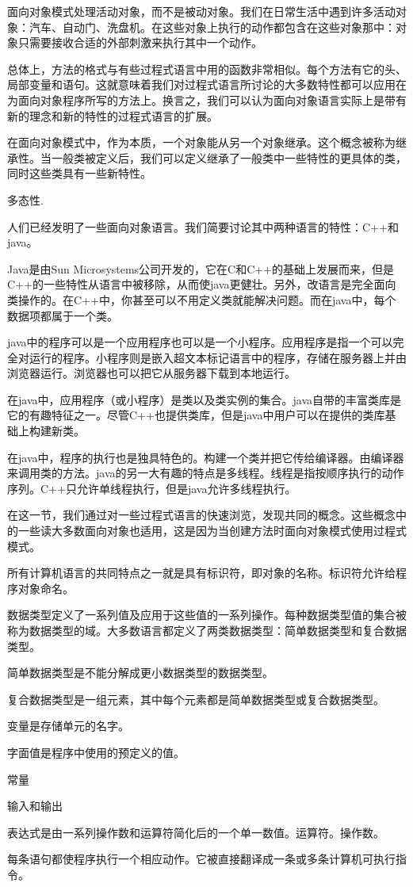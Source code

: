 面向对象模式处理活动对象，而不是被动对象。我们在日常生活中遇到许多活动对象：汽车、自动门、洗盘机。在这些对象上执行的动作都包含在这些对象那中：对象只需要接收合适的外部刺激来执行其中一个动作。

总体上，方法的格式与有些过程式语言中用的函数非常相似。每个方法有它的头、局部变量和语句。这就意味着我们对过程式语言所讨论的大多数特性都可以应用在为面向对象程序所写的方法上。换言之，我们可以认为面向对象语言实际上是带有新的理念和新的特性的过程式语言的扩展。

在面向对象模式中，作为本质，一个对象能从另一个对象继承。这个概念被称为继承性。当一般类被定义后，我们可以定义继承了一般类中一些特性的更具体的类，同时这些类具有一些新特性。

多态性.

人们已经发明了一些面向对象语言。我们简要讨论其中两种语言的特性：C++和java。

Java是由Sun Microsystems公司开发的，它在C和C++的基础上发展而来，但是C++的一些特性从语言中被移除，从而使java更健壮。另外，改语言是完全面向类操作的。在C++中，你甚至可以不用定义类就能解决问题。而在java中，每个数据项都属于一个类。

java中的程序可以是一个应用程序也可以是一个小程序。应用程序是指一个可以完全对运行的程序。小程序则是嵌入超文本标记语言中的程序，存储在服务器上并由浏览器运行。浏览器也可以把它从服务器下载到本地运行。

在java中，应用程序（或小程序）是类以及类实例的集合。java自带的丰富类库是它的有趣特征之一。尽管C++也提供类库，但是java中用户可以在提供的类库基础上构建新类。

在java中，程序的执行也是独具特色的。构建一个类并把它传给编译器。由编译器来调用类的方法。java的另一大有趣的特点是多线程。线程是指按顺序执行的动作序列。C++只允许单线程执行，但是java允许多线程执行。

在这一节，我们通过对一些过程式语言的快速浏览，发现共同的概念。这些概念中的一些读大多数面向对象也适用，这是因为当创建方法时面向对象模式使用过程式模式。

所有计算机语言的共同特点之一就是具有标识符，即对象的名称。标识符允许给程序对象命名。

数据类型定义了一系列值及应用于这些值的一系列操作。每种数据类型值的集合被称为数据类型的域。大多数语言都定义了两类数据类型：简单数据类型和复合数据类型。

简单数据类型是不能分解成更小数据类型的数据类型。

复合数据类型是一组元素，其中每个元素都是简单数据类型或复合数据类型。

变量是存储单元的名字。

字面值是程序中使用的预定义的值。

常量

输入和输出

表达式是由一系列操作数和运算符简化后的一个单一数值。运算符。操作数。

每条语句都使程序执行一个相应动作。它被直接翻译成一条或多条计算机可执行指令。
